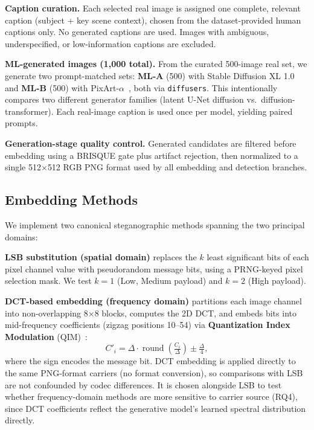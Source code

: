 \documentclass[10pt,twocolumn,a4paper]{article}
\begin{document}
\textbf{Caption curation.} Each selected real image is assigned one complete, relevant caption (subject + key scene context), chosen from the dataset-provided human captions only. No generated captions are used. Images with ambiguous, underspecified, or low-information captions are excluded.

\textbf{ML-generated images (1{,}000 total).} From the curated 500-image real set, we generate two prompt-matched sets: \textbf{ML-A} (500) with Stable Diffusion XL 1.0~\cite{sdxl2023} and \textbf{ML-B} (500) with PixArt-$\alpha$~\cite{pixart2023}, both via \texttt{diffusers}. This intentionally compares two different generator families (latent U-Net diffusion vs.\ diffusion-transformer). Each real-image caption is used once per model, yielding paired prompts.

\textbf{Generation-stage quality control.} Generated candidates are filtered before embedding using a BRISQUE gate plus artifact rejection, then normalized to a single 512$\times$512 RGB PNG format used by all embedding and detection branches.

\subsection{Embedding Methods}

We implement two canonical steganographic methods spanning the two principal domains:

\textbf{LSB substitution (spatial domain)} replaces the $k$ least significant bits of each pixel channel value with pseudorandom message bits, using a PRNG-keyed pixel selection mask. We test $k\!=\!1$ (Low, Medium payload) and $k\!=\!2$ (High payload).

\textbf{DCT-based embedding (frequency domain)} partitions each image channel into non-overlapping 8$\times$8 blocks, computes the 2D DCT, and embeds bits into mid-frequency coefficients (zigzag positions 10--54) via \textbf{Quantization Index Modulation} (QIM)~\cite{chen_wornell2001}:
\[
C'_i = \Delta\cdot\operatorname{round}\!\left(\tfrac{C_i}{\Delta}\right) \pm \tfrac{\Delta}{4},
\]
where the sign encodes the message bit. DCT embedding is applied directly to the same PNG-format carriers (no format conversion), so comparisons with LSB are not confounded by codec differences. It is chosen alongside LSB to test whether frequency-domain methods are more sensitive to carrier source (RQ4), since DCT coefficients reflect the generative model's learned spectral distribution directly.
\end{document}
